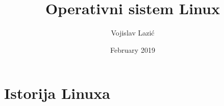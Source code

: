 \documentclass[11pt,oneside,a4paper]{article}
\begin{document}
\title{Operativni sistem Linux}
\author{Vojislav Lazić}
\date{February 2019}
\maketitle
\newpage
\tableofcontents
\newpage
\section{Istorija Linuxa}

\end{document}
